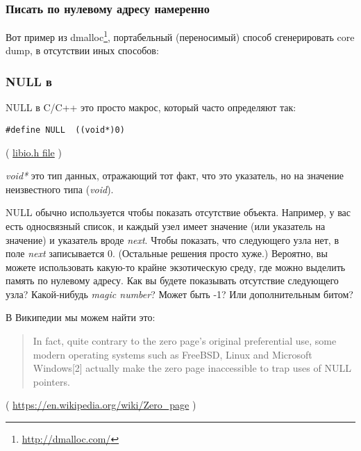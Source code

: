 \subsubsection{Писать по нулевому адресу намеренно}
\label{dmalloc_KILL_PROCESS}

Вот пример из dmalloc\footnote{\url{http://dmalloc.com/}},
портабельный (переносимый) способ сгенерировать core dump, в отсутствии иных способов:



\subsubsection{NULL в \CCpp}

NULL в C/C++ это просто макрос, который часто определяют так:

\begin{lstlisting}[style=customc]
#define NULL  ((void*)0)
\end{lstlisting}
( \href{https://github.com/wzhy90/linaro_toolchains/blob/8ff8ae680bac04558d10cc9626e12c4c2f6c1348/arm-cortex_a15-linux-gnueabihf/libc/usr/include/libio.h#L70}{libio.h file} )

\emph{void*} это тип данных, отражающий тот факт, что это указатель, но на значение неизвестного типа (\emph{void}).

NULL обычно используется чтобы показать отсутствие объекта.
Например, у вас есть односвязный список, и каждый узел имеет значение (или указатель на значение) и указатель вроде \emph{next}.
Чтобы показать, что следующего узла нет, в поле \emph{next} записывается 0.
(Остальные решения просто хуже.)
Вероятно, вы можете использовать какую-то крайне экзотическую среду, где можно выделить память по нулевому адресу.
Как вы будете показывать отсутствие следующего узла?
Какой-нибудь \emph{magic number}? Может быть -1? Или дополнительным битом?

В Википедии мы можем найти это:

\begin{framed}
\begin{quotation}
In fact, quite contrary to the zero page's original preferential use, some modern operating systems such as FreeBSD, Linux and Microsoft Windows[2] actually make the zero page inaccessible to trap uses of NULL pointers. 
\end{quotation}
\end{framed}
( \url{https://en.wikipedia.org/wiki/Zero_page} )

